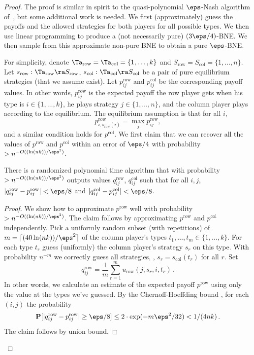 \begin{proof}
The proof is similar in spirit to the quasi-polynomial $\eps$-Nash algorithm of~\cite{LMM03}, but some additional work 
is needed. We first (approximately) guess the payoffs and the allowed strategies for both players for all possible types. We then use linear programming to produce a (not necessarily pure) $(3\eps/4)$-BNE\@. We then sample from this approximate non-pure BNE to obtain a
pure $\eps$-BNE\@. 

For simplicity, denote $\Ta_{\mathrm{row}}=\Ta_\mathrm{col}=\{1,\ldots,k\}$ and $S_{\mathrm{row}}=S_\mathrm{col} = \{1,\ldots,n\}$. Let $s_{\mathrm{row}}:\Ta_{\mathrm{row}}\ra S_{\mathrm{row}}$, $s_\mathrm{col}:\Ta_\mathrm{col}\ra S_\mathrm{col}$ be 
a pair of pure equilibrium strategies (that we assume exist). Let $p^{\mathrm{row}}_{ij}$ and $p^\mathrm{col}_{ij}$ be the corresponding 
 payoff values. In other words, $p^{\mathrm{row}}_{ij}$ is the expected payoff the row player gets when his type is $i\in\{1,\ldots,k\}$, he plays strategy $j\in\{1,\ldots,n\}$, and the column player plays according to the equilibrium. The equilibrium assumption is that for all $i$,
 $$
 p^{\mathrm{row}}_{i,s_{\mathrm{row}}(i)} = \max_j p^{\mathrm{row}}_{ij},
 $$
 and a similar condition holds for $p^\mathrm{col}$. We first claim that we can recover all the values of $p^{\mathrm{row}}$ and $p^\mathrm{col}$ within 
 an error of $\eps/4$ with probability $>n^{-O((\ln (nk))/\eps^2)}$.
\begin{claim}
\label{cl:BNE1}
There is a randomized polynomial time algorithm that with probability $>n^{-O((\ln (nk))/\eps^2)}$ outputs values $q^{\mathrm{row}}_{ij}$, $q^\mathrm{col}_{ij}$ such that for all $i,j$, 
$|q^{\mathrm{row}}_{ij}-p^{\mathrm{row}}_{ij}|<\eps/8$ and $|q^\mathrm{col}_{ij}-p^\mathrm{col}_{ij}|<\eps/8$.
\end{claim}

\begin{proof}
We show how to approximate $p^{\mathrm{row}}$ well with probability $>n^{-O((\ln (nk))/\eps^2)}$. The claim follows by approximating $p^{\mathrm{row}}$ and $p^\mathrm{col}$ independently.
Pick a uniformly random subset (with repetitions) of $m=\lceil (40\ln (nk))/\eps^2\rceil$ of the column player's types $t_1,\ldots,t_m\in\{1,\ldots,k\}$. For each type $t_r$ guess (uniformly) the column player's strategy $s_r$ on this type. With probability $n^{-m}$ we correctly guess all strategies, \ie, $s_r = s_\mathrm{col}(t_r)$ for all $r$. Set 
$$
q^{\mathrm{row}}_{ij} = \frac{1}{m}\sum_{r=1}^{m} u_{\mathrm{row}}(j,s_r,i,t_r)\,.
$$
In other words, we calculate an estimate of the expected payoff $p^{\mathrm{row}}$ using only the value at the types we've guessed. By the Chernoff-Hoeffding bound , for each $(i,j)$ the probability 
$$
{\mathbf P}[|q^{\mathrm{row}}_{ij}-p^{\mathrm{row}}_{ij}|\ge \eps/8] \le 2\cdot \exp(-m\eps^2/32) < 1/(4nk)\,.
$$
The claim follows by union bound. 
\end{proof}


\end{proof}
